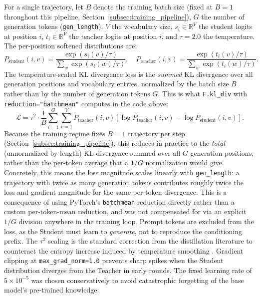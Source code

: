 \documentclass[11pt, a4paper]{article}
\begin{document}
For a single trajectory, let $B$ denote the training batch size (fixed at $B=1$ throughout this pipeline, Section~\ref{subsec:training_pipeline}), $G$ the number of generation tokens (\texttt{gen\_length}), $V$ the vocabulary size, $s_i \in \mathbb{R}^V$ the student logits at position $i$, $t_i \in \mathbb{R}^V$ the teacher logits at position $i$, and $\tau = 2.0$ the temperature. The per-position softened distributions are:
\begin{equation}
    P_{\text{student}}(i, v) = \frac{\exp(s_i(v) / \tau)}{\sum_w \exp(s_i(w) / \tau)}, \quad
    P_{\text{teacher}}(i, v) = \frac{\exp(t_i(v) / \tau)}{\sum_w \exp(t_i(w) / \tau)}.
\end{equation}
The temperature-scaled KL divergence loss is the \emph{summed} KL divergence
over all generation positions and vocabulary entries, normalized by the batch size
$B$ rather than by the number of generation tokens $G$. This is what
\texttt{F.kl\_div} with \texttt{reduction="batchmean"} computes in the code above:
\begin{equation}
    \mathcal{L} = \tau^2 \cdot \frac{1}{B} \sum_{i=1}^{G} \sum_{v=1}^{V}
    P_{\text{teacher}}(i, v) \left[ \log P_{\text{teacher}}(i, v) - \log P_{\text{student}}(i, v) \right].
\end{equation}
Because the training regime fixes $B = 1$ trajectory per step
(Section~\ref{subsec:training_pipeline}), this reduces in practice to the
\emph{total} (unnormalized-by-length) KL divergence summed over all $G$ generation
positions, rather than the per-token average that a $1/G$ normalization would give.
Concretely, this means the loss magnitude scales linearly with \texttt{gen\_length}:
a trajectory with twice as many generation tokens contributes roughly twice the
loss and gradient magnitude for the same per-token divergence. This is a
consequence of using PyTorch's \texttt{batchmean} reduction directly rather than a
custom per-token-mean reduction, and was not compensated for via an explicit
$1/G$ division anywhere in the training loop.
Prompt tokens are excluded from the loss, as the Student must learn to \emph{generate}, not to reproduce the conditioning prefix. The $\tau^2$ scaling is the standard correction from the distillation literature to counteract the entropy increase induced by temperature smoothing \cite{hinton2015distilling}. Gradient clipping at \texttt{max\_grad\_norm=1.0} prevents sharp spikes when the Student distribution diverges from the Teacher in early rounds. The fixed learning rate of $5 \times 10^{-5}$ was chosen conservatively to avoid catastrophic forgetting of the base model's pre-trained knowledge.
\end{document}
